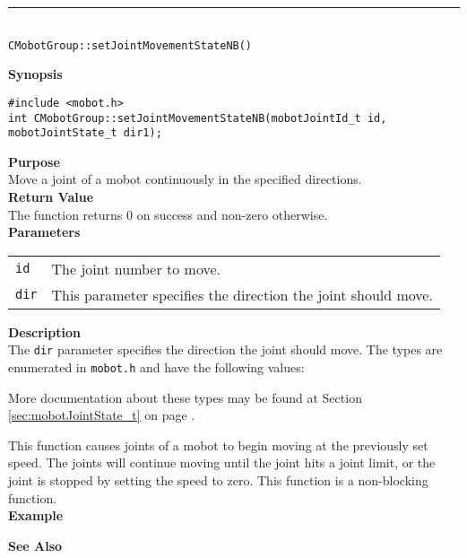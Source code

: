 \noindent
\vspace{5pt}
\rule{4.5in}{0.015in}\\
\noindent
{\LARGE \texttt{CMobotGroup::setJointMovementStateNB()}}\\
{}

\noindent
{\bf Synopsis}
\vspace{-8pt}
\begin{verbatim}
#include <mobot.h>
int CMobotGroup::setJointMovementStateNB(mobotJointId_t id, mobotJointState_t dir1);
\end{verbatim}

\noindent
{\bf Purpose}\\
Move a joint of a mobot continuously in the specified directions.\\

\noindent
{\bf Return Value}\\
The function returns 0 on success and non-zero otherwise.\\

\noindent
{\bf Parameters}\\
\vspace{-0.1in}
\begin{description}
\item               
\begin{tabular}{p{10 mm}p{145 mm}}
\texttt{id} & The joint number to move. \\
\texttt{dir} &  
This parameter specifies the direction the joint should move. \\
\end{tabular}
\end{description}

\noindent
{\bf Description}\\
The \texttt{dir} parameter specifies the direction the joint should move.
The types
are enumerated in \texttt{mobot.h} and have the following values:

More documentation about these types may be found at Section
\ref{sec:mobotJointState_t} on page
\pageref{sec:mobotJointState_t}.  

This function causes joints of a mobot to begin moving at the previously set
speed. The joints will continue moving until the joint hits a joint limit, or
the joint is stopped by setting the speed to zero. This function is a non-blocking
function.\\

\noindent
{\bf Example}\\
\noindent

\noindent
{\bf See Also}\\

